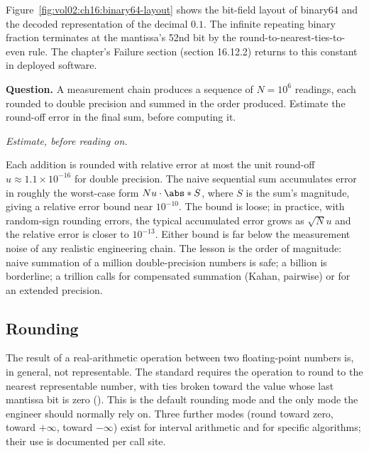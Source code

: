 

Figure~\ref{fig:vol02:ch16:binary64-layout} shows the bit-field
layout of binary64 and the decoded representation of the decimal
$0.1$. The infinite repeating binary fraction terminates at the
mantissa's 52nd bit by the round-to-nearest-ties-to-even rule. The
chapter's Failure section (section 16.12.2) returns to this constant
in deployed software.

\begin{estimation}
\textbf{Question.} A measurement chain produces a sequence of
$N = 10^{6}$ readings, each rounded to double precision and
summed in the order produced. Estimate the round-off error in the
final sum, before computing it.

\smallskip
\textit{Estimate, before reading on.}

\smallskip
Each addition is rounded with relative error at most the unit
round-off $u \approx 1.1 \times 10^{-16}$ for double precision. The
naive sequential sum accumulates error in roughly the worst-case
form $N u \cdot \abs*{S}$, where $S$ is the sum's magnitude, giving
a relative error bound near $10^{-10}$. The bound is loose; in
practice, with random-sign rounding errors, the typical accumulated
error grows as $\sqrt{N} u$ and the relative error is closer to
$10^{-13}$. Either bound is far below the measurement noise of any
realistic engineering chain. The lesson is the order of magnitude:
naive summation of a million double-precision numbers is safe; a
billion is borderline; a trillion calls for compensated summation
(Kahan, pairwise) or for an extended precision.
\end{estimation}

\subsection{Rounding}

The result of a real-arithmetic operation between two
floating-point numbers is, in general, not representable. The
standard requires the operation to round to the nearest
representable number, with ties broken toward the value whose last
mantissa bit is zero ().
This is the default rounding mode and the only mode the engineer
should normally rely on. Three further modes (round toward zero,
toward $+\infty$, toward $-\infty$) exist for interval arithmetic
and for specific algorithms; their use is documented per call site.


